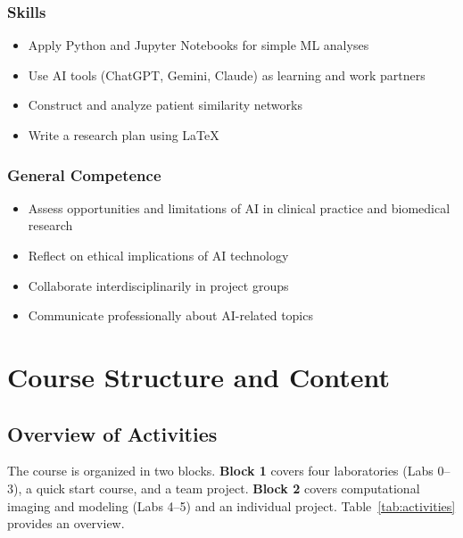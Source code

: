 \documentclass[11pt,a4paper]{article}
\begin{document}
\subsubsection*{Skills}
\begin{itemize}[nosep]
    \item Apply Python and Jupyter Notebooks for simple ML analyses
    \item Use AI tools (ChatGPT, Gemini, Claude) as learning and work partners
    \item Construct and analyze patient similarity networks
    \item Write a research plan using LaTeX
\end{itemize}

\subsubsection*{General Competence}
\begin{itemize}[nosep]
    \item Assess opportunities and limitations of AI in clinical practice and biomedical research
    \item Reflect on ethical implications of AI technology
    \item Collaborate interdisciplinarily in project groups
    \item Communicate professionally about AI-related topics
\end{itemize}

\section{Course Structure and Content}

\subsection{Overview of Activities}

The course is organized in two blocks. \textbf{Block 1} covers four laboratories (Labs 0--3), a quick start course, and a team project. \textbf{Block 2} covers computational imaging and modeling (Labs 4--5) and an individual project. Table~\ref{tab:activities} provides an overview.
\end{document}
